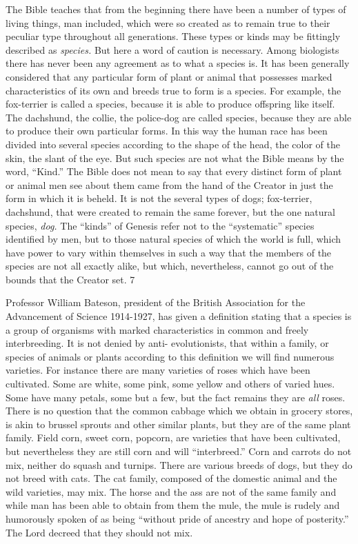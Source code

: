 The Bible teaches that from the beginning there have been a number of types of living things,
man included, which were so created as to remain true to their peculiar type throughout all
generations. These types or kinds may be fittingly described as \textit{species.} But here a word of
caution is necessary. Among biologists there has never been any agreement as to what a
species is. It has been generally considered that any particular form of plant or animal that
possesses marked characteristics of its own and breeds true to form is a species. For example,
the fox-terrier is called a species, because it is able to produce offspring like itself. The
dachshund, the collie, the police-dog are called species, because they are able to produce
their own particular forms. In this way the human race has been divided into several species
according to the shape of the head, the color of the skin, the slant of the eye. But such species
are not what the Bible means by the word, ``Kind.'' The Bible does not mean to say that every
distinct form of plant or animal men see about them came from the hand of the Creator in just
the form in which it is beheld. It is not the several types of dogs; fox-terrier, dachshund, that
were created to remain the same forever, but the one natural species, \textit{dog.} The ``kinds'' of
Genesis refer not to the ``systematic'' species identified by men, but to those natural species of
which the world is full, which have power to vary within themselves in such a way that the
members of the species are not all exactly alike, but which, nevertheless, cannot go out of the
bounds that the Creator set. 7

Professor William Bateson, president of the British Association for the Advancement of
Science 1914-1927, has given a definition stating that a species is a group of organisms with
marked characteristics in common and freely interbreeding. It is not denied by anti-
evolutionists, that within a family, or species of animals or plants according to this definition
we will find numerous varieties. For instance there are many varieties of roses which have
been cultivated. Some are white, some pink, some yellow and others of varied hues. Some
have many petals, some but a few, but the fact remains they are \textit{all} roses. There is no
question that the common cabbage which we obtain in grocery stores, is akin to brussel
sprouts and other similar plants, but they are of the same plant family. Field corn, sweet corn,
popcorn, are varieties that have been cultivated, but nevertheless they are still corn and will
``interbreed.'' Corn and carrots do not mix, neither do squash and turnips. There are various
breeds of dogs, but they do not breed with cats. The cat family, composed of the domestic
animal and the wild varieties, may mix. The horse and the ass are not of the same family and
while man has been able to obtain from them the mule, the mule is rudely and humorously
spoken of as being ``without pride of ancestry and hope of posterity.'' The Lord decreed that
they should not mix.

